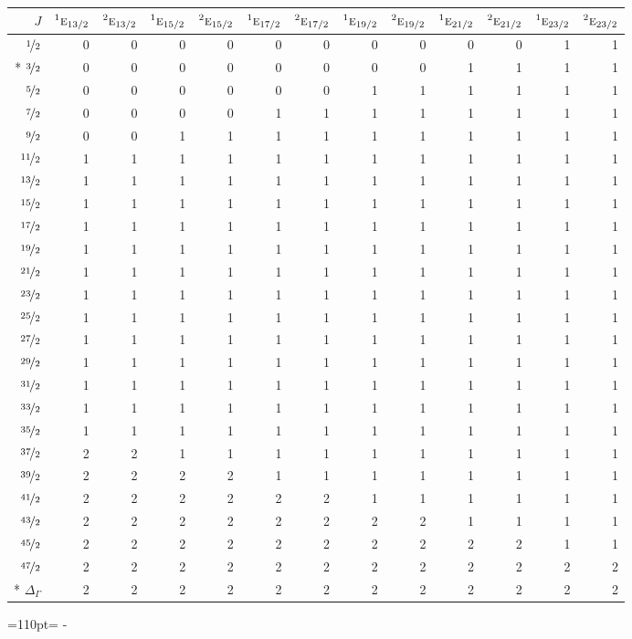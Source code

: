 \documentclass[10pt,a4paper]{article}
\makeatletter
\def\grouprule#1#2{\noalign{\marks\LTgroupmarks{\the\belowrulesep}\nobreak\vskip#1%
  \vskip\aboverulesep}\multispan\LT@cols\unskip{\leaders\hrule\@height#2\hfill\kern\z@}\cr
  \noalign{\penalty\LTrulebreak\vskip\belowrulesep\global\@lastruleclass\z@}}
\newcommand{\needspace}[1]{\par\penalty-100\begingroup\dimen0=#1\relax\dimen2=\pagegoal
  \advance\dimen2-\pagetotal\ifdim\dimen0>\dimen2\relax\ifdim\dimen2>0pt\vfil\break\fi\fi
  \endgroup}
\numberwithin{equation}{section}
\newcommand{\irr}[1]{\text{\normalfont\scshape #1}}
\newcommand{\conjpair}[1]{{}^{#1}}
\makeatother
\begin{document}
{\small\begin{longtable}{@{}rrrrrrrrrrrrr@{}}\toprule
$J$ & $\conjpair{1}\irr{e}_{13/2}$ & $\conjpair{2}\irr{e}_{13/2}$ & $\conjpair{1}\irr{e}_{15/2}$ & $\conjpair{2}\irr{e}_{15/2}$ & $\conjpair{1}\irr{e}_{17/2}$ & $\conjpair{2}\irr{e}_{17/2}$ & $\conjpair{1}\irr{e}_{19/2}$ & $\conjpair{2}\irr{e}_{19/2}$ & $\conjpair{1}\irr{e}_{21/2}$ & $\conjpair{2}\irr{e}_{21/2}$ & $\conjpair{1}\irr{e}_{23/2}$ & $\conjpair{2}\irr{e}_{23/2}$\\\midrule\endhead
\bottomrule\endfoot\endlastfoot
$\nicefrac{1}{2}$ & 0 & 0 & 0 & 0 & 0 & 0 & 0 & 0 & 0 & 0 & 1 & 1\\*
$\nicefrac{3}{2}$ & 0 & 0 & 0 & 0 & 0 & 0 & 0 & 0 & 1 & 1 & 1 & 1\\
$\nicefrac{5}{2}$ & 0 & 0 & 0 & 0 & 0 & 0 & 1 & 1 & 1 & 1 & 1 & 1\\
$\nicefrac{7}{2}$ & 0 & 0 & 0 & 0 & 1 & 1 & 1 & 1 & 1 & 1 & 1 & 1\\
$\nicefrac{9}{2}$ & 0 & 0 & 1 & 1 & 1 & 1 & 1 & 1 & 1 & 1 & 1 & 1\\
$\nicefrac{11}{2}$ & 1 & 1 & 1 & 1 & 1 & 1 & 1 & 1 & 1 & 1 & 1 & 1\\
$\nicefrac{13}{2}$ & 1 & 1 & 1 & 1 & 1 & 1 & 1 & 1 & 1 & 1 & 1 & 1\\
$\nicefrac{15}{2}$ & 1 & 1 & 1 & 1 & 1 & 1 & 1 & 1 & 1 & 1 & 1 & 1\\
$\nicefrac{17}{2}$ & 1 & 1 & 1 & 1 & 1 & 1 & 1 & 1 & 1 & 1 & 1 & 1\\
$\nicefrac{19}{2}$ & 1 & 1 & 1 & 1 & 1 & 1 & 1 & 1 & 1 & 1 & 1 & 1\\
$\nicefrac{21}{2}$ & 1 & 1 & 1 & 1 & 1 & 1 & 1 & 1 & 1 & 1 & 1 & 1\\
$\nicefrac{23}{2}$ & 1 & 1 & 1 & 1 & 1 & 1 & 1 & 1 & 1 & 1 & 1 & 1\\
$\nicefrac{25}{2}$ & 1 & 1 & 1 & 1 & 1 & 1 & 1 & 1 & 1 & 1 & 1 & 1\\
$\nicefrac{27}{2}$ & 1 & 1 & 1 & 1 & 1 & 1 & 1 & 1 & 1 & 1 & 1 & 1\\
$\nicefrac{29}{2}$ & 1 & 1 & 1 & 1 & 1 & 1 & 1 & 1 & 1 & 1 & 1 & 1\\
$\nicefrac{31}{2}$ & 1 & 1 & 1 & 1 & 1 & 1 & 1 & 1 & 1 & 1 & 1 & 1\\
$\nicefrac{33}{2}$ & 1 & 1 & 1 & 1 & 1 & 1 & 1 & 1 & 1 & 1 & 1 & 1\\
$\nicefrac{35}{2}$ & 1 & 1 & 1 & 1 & 1 & 1 & 1 & 1 & 1 & 1 & 1 & 1\\
$\nicefrac{37}{2}$ & 2 & 2 & 1 & 1 & 1 & 1 & 1 & 1 & 1 & 1 & 1 & 1\\
$\nicefrac{39}{2}$ & 2 & 2 & 2 & 2 & 1 & 1 & 1 & 1 & 1 & 1 & 1 & 1\\
$\nicefrac{41}{2}$ & 2 & 2 & 2 & 2 & 2 & 2 & 1 & 1 & 1 & 1 & 1 & 1\\
$\nicefrac{43}{2}$ & 2 & 2 & 2 & 2 & 2 & 2 & 2 & 2 & 1 & 1 & 1 & 1\\
$\nicefrac{45}{2}$ & 2 & 2 & 2 & 2 & 2 & 2 & 2 & 2 & 2 & 2 & 1 & 1\\
$\nicefrac{47}{2}$ & 2 & 2 & 2 & 2 & 2 & 2 & 2 & 2 & 2 & 2 & 2 & 2\\*
\grouprule{0pt}{\lightrulewidth} $\Delta_\Gamma$ & 2 & 2 & 2 & 2 & 2 & 2 & 2 & 2 & 2 & 2 & 2 & 2\\
\bottomrule\end{longtable}}
\needspace{110pt}
\end{document}
